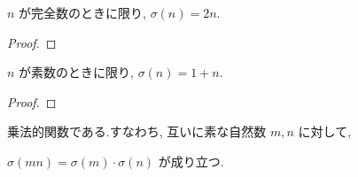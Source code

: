 \begin{lemma}\label{perfect_iff_sum_divisors_eq_two_mul}
\leanok

\(n\) が完全数のときに限り, \(\sigma(n) = 2n\).

\end{lemma}

\begin{proof}

\end{proof}

\begin{lemma}\label{prime_iff_sum_divisors_eq_succ}
\leanok

\(n\) が素数のときに限り, \(\sigma(n) =  1 + n\).

\end{lemma}

\begin{proof}

\end{proof}

\begin{lemma}\label{isMultiplicative}

\leanok
乗法的関数である.すなわち, 互いに素な自然数 \(m, n\) に対して,

\(\sigma(mn) = \sigma(m) \cdot \sigma(n)\) が成り立つ.

\end{lemma}

